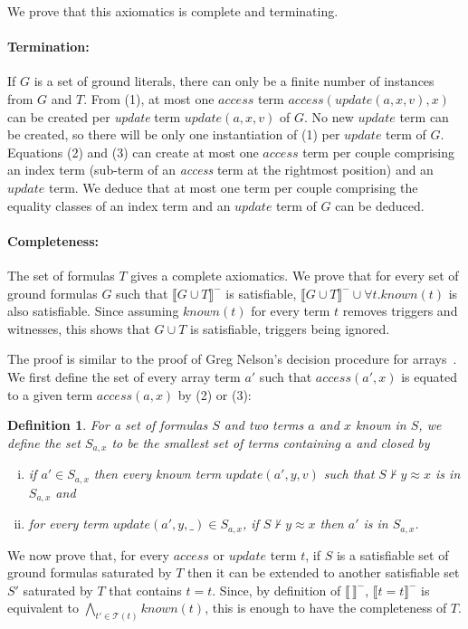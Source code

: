 \documentclass[]{easychair}
\newcommand{\terms}{\mathcal{T}}
\newcommand{\Fm}[1]{\llb #1 \rrb^-}
\newcommand{\K}{\mathit{known}}
\newcommand{\update}{\mathit{update}}
\newcommand{\access}{\mathit{access}}
\newcommand{\llb}{\llbracket} \newcommand{\rrb}{\rrbracket}
\newtheorem{definition}{Definition}[section]
\begin{document}
We prove that this axiomatics is complete and terminating.
\paragraph{Termination:}
If $G$ is a set of ground literals, there can only be a finite number of
instances from $G$ and $T$. From (1), at most
one $\access$ term $\access(\update(a,x,v),x)$ can be created per
\emph{update} term $\update(a,x,v)$ of $G$. No new $\update$ term
can be created, so there will be only one instantiation of (1) per $\update$
term of $G$. Equations (2) and (3) can create at
most one $\access$ term per couple comprising an index term (sub-term of an
\emph{access} term at the rightmost position) and an $\update$ term. We deduce
that at most one term per couple comprising the equality classes of an index
term and an $\update$ term of $G$ can be deduced.
\paragraph{Completeness:}
The set of formulas $T$ gives a complete axiomatics. We prove that for every
set of ground formulas $G$ such that $\Fm{G\cup T}$
is satisfiable, $\Fm{G\cup T}\cup\forall t.\K(t)$ is also satisfiable. Since
assuming $\K(t)$
for every term $t$ removes triggers and witnesses, this shows that $G\cup T$
is satisfiable, triggers being ignored.

The proof is similar to the proof of Greg Nelson's decision procedure for
arrays~\cite{nelson-arrays}. We first define the set of every array term $a'$
such that $\access(a',x)$ is equated to a given term $\access(a,x)$ by (2) or
(3):
\begin{definition} For a set of formulas $S$ and two terms $a$ and $x$ known in
$S$, we define the set $S_{a,x}$ to be the smallest set of terms
containing $a$ and closed by
\begin{enumerate}[(i)]
 \item if $a'\in S_{a,x}$ then every known term
$\update(a',y,v)$ such that $S\nvdash y \approx x$ is in $S_{a,x}$ and
 \item for
every term $\update(a',y,\_)\in S_{a,x}$,
if $S\nvdash y \approx x$ then $a'$ is in $S_{a,x}$.
\end{enumerate}
\end{definition}

We now prove that, for every $\access$ or $\update$ term $t$, if $S$ is a
satisfiable set of ground formulas saturated by $T$ then it can be
extended to another satisfiable set $S'$ saturated by $T$ that contains $t=t$.
Since, by definition of $\Fm{\,}$, $\Fm{t=t}$ is equivalent to
$\bigwedge_{t'\in\terms(t)}\K(t)$, this is enough to have the completeness of
$T$.
\end{document}
